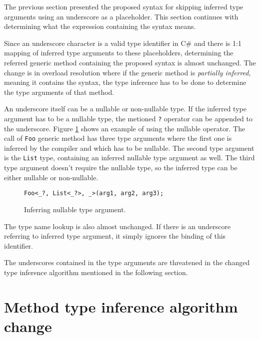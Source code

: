 The previous section presented the proposed syntax for skipping inferred type arguments using an underscore as a placeholder. 
This section continues with determining what the expression containing the syntax means.
\par
Since an underscore character is a valid type identifier in C\# and there is
1:1 mapping of inferred type arguments to these placeholders, determining the referred generic method containing the proposed syntax is almost unchanged. 
The change is in overload resolution where if the generic method is \textit{partially inferred}, meaning it contains the syntax, the type inference has to be done to determine the type arguments of that method.
\par
An underscore itself can be a nullable or non-nullable type. 
If the inferred type argument has to be a nullable type, the metioned \texttt{?} operator can be appended to the underscore. 
Figure \ref{img53:null} shows an example of using the nullable operator. 
The call of \texttt{Foo} generic method has three type arguments where the first one is inferred by the compiler and which has to be nullable. 
The second type argument is the \texttt{List} type, containing an inferred nullable type argument as well. 
The third type argument doesn’t require the nullable type, so the inferred type can be either nullable or non-nullable.
\begin{figure}[h!]
\begin{lstlisting}[style=csharp]
Foo<_?, List<_?>, _>(arg1, arg2, arg3);
\end{lstlisting}
\caption{Inferring nullable type argument.}
\label{img53:null}
\end{figure}
\par
The type name lookup is also almost unchanged. 
If there is an underscore
referring to inferred type argument, it simply ignores the binding of this identifier.
\par
The underscores contained in the type arguments are threatened in the changed type inference algorithm mentioned in the following section.

\section{Method type inference algorithm change}

